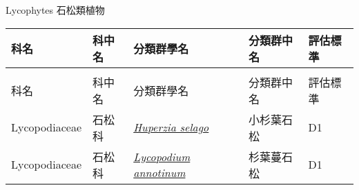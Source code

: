 \noindent\normalfont\selectfont Lycophytes 石松類植物
\footnotesize\selectfont
        {\def\arraystretch{1.5}\tabcolsep=2pt
        \begin{longtable}{p{2.5cm}p{2.5cm}p{4.5cm}p{2.5cm}p{3cm}}
        \toprule
          科名 & 科中名 & 分類群學名 & 分類群中名 & 評估標準 \\
        \midrule 
        \endfirsthead

        \multicolumn{4}{l}{\bfseries\Large\color{red}{國家易危 (NVU) 類別維管束植物名錄(續)}} \\
        \toprule
        科名 & 科中名 & 分類群學名 & 分類群中名 & 評估標準 \\
        \midrule
        \endhead
                Lycopodiaceae & 石松科 & \href{http://www.theplantlist.org/tpl1.1/search?q=Huperzia+selago}{\textit{Huperzia selago} } & 小杉葉石松 & D1 \index{Huperzia@\textit{Huperzia}!selago@\textit{selago}}  \index{小杉葉石松} \\
    Lycopodiaceae & 石松科 & \href{http://www.theplantlist.org/tpl1.1/search?q=Lycopodium+annotinum}{\textit{Lycopodium annotinum} } & 杉葉蔓石松 & D1 \index{Lycopodium@\textit{Lycopodium}!annotinum@\textit{annotinum}}  \index{杉葉蔓石松} \\
    \bottomrule
        \end{longtable}
        }
    